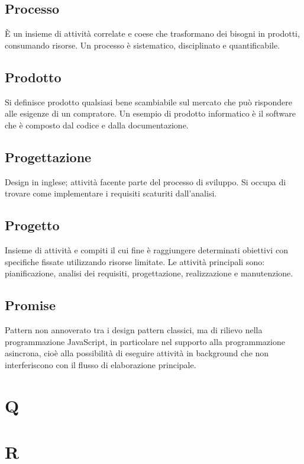 \subsection*{Processo}
È un insieme di attività correlate e coese che trasformano dei bisogni in prodotti, consumando risorse. Un processo è sistematico, disciplinato e quantificabile.

\subsection*{Prodotto}
Si definisce prodotto qualsiasi bene scambiabile sul mercato che può rispondere alle esigenze di un compratore. Un esempio di prodotto informatico è il software che è composto dal codice e dalla documentazione.

\subsection*{Progettazione}
Design in inglese; attività facente parte del processo di sviluppo. Si occupa di trovare come implementare i requisiti scaturiti dall'analisi.

\subsection*{Progetto}
Insieme di attività e compiti il cui fine è raggiungere determinati obiettivi con specifiche fissate utilizzando risorse limitate. Le attività principali sono: pianificazione, analisi dei requisiti, progettazione, realizzazione e manutenzione.

\subsection*{Promise}
Pattern non annoverato tra i design pattern classici, ma di rilievo nella programmazione JavaScript, in particolare nel supporto alla programmazione asincrona, cioè alla possibilità di eseguire attività in background che non interferiscono con il flusso di elaborazione principale.

\clearpage
\section*{Q}

\clearpage
\section*{R}

